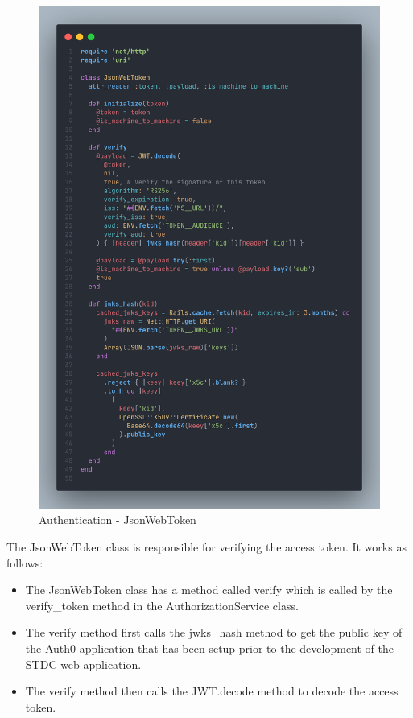 \begin{justify}
        \begin{figure}[H]
            \centerline{\includegraphics[width=150mm,scale=1]{figures/implementation_and_testing/implementation/backend/JsonWebToken.png}}
            \caption{Authentication - JsonWebToken}
        \end{figure}

        \newendline The JsonWebToken class is responsible for verifying the access token. It works as follows:

            \begin{itemize}
                \item The JsonWebToken class has a method called verify which is called by the verify\_token method in the AuthorizationService class.
                \item The verify method first calls the jwks\_hash method to get the public key of the Auth0 application that has been setup prior to the development of the STDC web application.
                \item The verify method then calls the JWT.decode method to decode the access token.


\end{itemize}
\end{justify}
